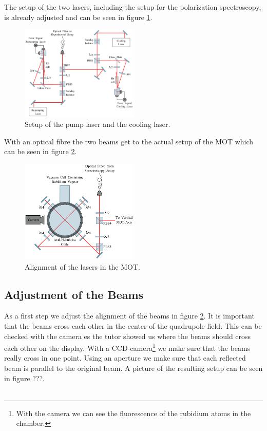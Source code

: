 The setup of the two lasers, including the setup for the polarization spectroscopy, is already adjusted and can be seen in figure \ref{fig:setup_laser}.

\begin{figure}[h]
  \centering
  \includegraphics[width=0.5\textwidth]{figures/setup_laser.png}
  \caption{Setup of the pump laser and the cooling laser.}
  \label{fig:setup_laser}
\end{figure}

With an optical fibre the two beams get to the actual setup of the MOT which can be seen in figure \ref{fig:setup_mot}.

\begin{figure}[h]
  \centering
  \includegraphics[width=0.5\textwidth]{figures/setup_mot.png}
  \caption{Alignment of the lasers in the MOT.}
  \label{fig:setup_mot}
\end{figure}

\subsection{Adjustment of the Beams}
As a first step we adjust the alignment of the beams in figure \ref{fig:setup_mot}. It is important that the beams cross each other in the center of the quadrupole field. This can be checked with the camera es the tutor showed us where the beams should cross each other on the display. With a CCD-camera\footnote{With the camera we can see the fluorescence of the rubidium atoms in the chamber.} we make sure that the beams really cross in one point. Using an aperture we make sure that each reflected beam is parallel to the original beam. A picture of the resulting setup can be seen in figure ???.\\ \\

